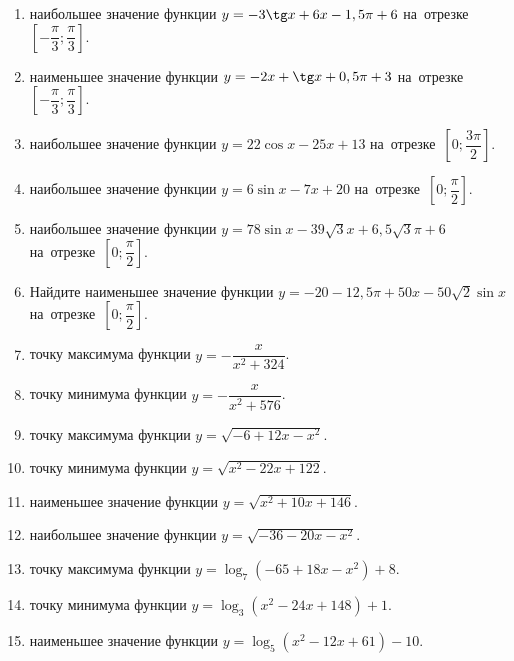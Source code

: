 \documentclass[a4paper,10pt]{article}
\begin{document}
\begin{enumerate}
\item {} наибольшее значение функции $y=-3\tg x +6x-1,5\pi +6$ на~отрезке~$\left[-\dfrac{\pi}{3};\dfrac{\pi}{3}\right]$.

\item {} наименьшее значение функции $y=-2x +\tg x+0,5\pi+3$ на~отрезке~$\left[-\dfrac{\pi}{3};\dfrac{\pi}{3}\right]$.

\item {} наибольшее значение функции $y=22\cos x-25x+13$ на~отрезке~$\left[0;\dfrac{3\pi}{2}\right]$.

\item {} наибольшее значение функции $y=6\sin x-7x+20$ на~отрезке~$\left[0;\dfrac{\pi}{2}\right]$.

\item {} наибольшее значение функции $y=78\sin x-39\sqrt{3}x+6,5\sqrt{3}\pi +6$ на~отрезке~$\left[0;\dfrac{\pi}{2}\right]$.

\item Найдите наименьшее значение функции $y=-20-12,5\pi+50x-50\sqrt{2}\sin x$ на~отрезке~$\left[0;\dfrac{\pi}{2}\right]$.

\item {} точку максимума функции $y=-\dfrac{x}{ x^2 +324}$.

\item {} точку минимума функции $y=-\dfrac{x}{ x^2 +576}$.

\item {} точку максимума функции $y=\sqrt{-6+12x-x^2}$.

\item {} точку минимума функции $y=\sqrt{x^2-22x+122}$.

\item {} наименьшее значение функции $y=\sqrt{x^2+10x+146}$.

\item {} наибольшее значение функции $y=\sqrt{-36-20x-x^2}$.

\item {} точку максимума функции $y=\log_7\left(-65+18x-x^2\right)+8$.

\item {} точку минимума функции $y=\log_3\left(x^2-24x+148\right)+1$.

\item {} наименьшее значение функции $y=\log_5\left(x^2-12x+61\right)-10$.


\end{enumerate}
\end{document}
